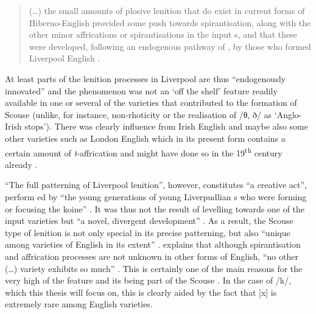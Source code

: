 	\begin{quote}
		(\ldots) the small amounts of plosive lenition that do exist in current forms of Hiberno-English provided some push towards spirantisation, along with the other minor affrications or spirantisations in the input s, and that these were developed, following an endogenous pathway of , by those who formed Liverpool English \citeyearpar[131]{honeybone2007}.
	\end{quote}

At least parts of the lenition processes in Liverpool are thus ``endogenously innovated'' \citep[130]{honeybone2007} and the phenomenon was not an `off the shelf' feature readily available in one or several of the varieties that contributed to the formation of Scouse (unlike, for instance, non-rhoticity or the realisation of /θ, ð/ as `Anglo-Irish stops').
There was clearly influence from Irish English and maybe also some other varieties such as London English which in its present form contains a certain amount of \emph{t}-affrication and might have done so in the 19\textsuperscript{th} century already \parencite[cf.][132]{honeybone2007}.

``The full patterning of Liverpool lenition'', however, constitutes ``a creative act'', perform ed by ``the young generations of young Liverpudlian s who were forming or focusing the koine'' \parencite[132]{honeybone2007}.
It was thus not the result of levelling towards one of the input varieties but ``a novel, divergent development'' \parencite[132]{honeybone2007}.
As a result, the Scouse type of lenition is not only special in its precise patterning, but also ``unique among varieties of English in its extent'' \parencite[132]{honeybone2007}.
\textcite[130]{honeybone2007} explains that although spirantisation and affrication processes are not unknown in other forms of English, ``no other (\ldots) variety exhibits so much'' \parencite[130]{honeybone2007}.
This is certainly one of the main reasons for the very high  of the feature and its being part of the Scouse .
In the case of /k/, which this thesis will focus on, this is clearly aided by the fact that [x] is extremely rare among English varieties.

